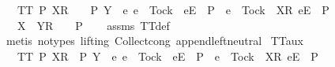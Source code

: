 \ \ \ {\isachardoublequoteopen}TT{}\ P{\isachardoublequoteclose}\ {\isachardoublequoteopen}{\isacharbrackleft}{\isacharbrackleft}X{\isacharbrackright}\isactrlsub R{\isacharbrackright}\ {\isacharat}\ {\isasymsigma}\ {\isasymin}\ P{\isachardoublequoteclose}\ {\isachardoublequoteopen}Y\ {\isasyminter}\ {\isacharbraceleft}e{\isachardot}\ {\isacharparenleft}e\ {\isasymnoteq}\ Tock\ {\isasymand}\ {\isacharbrackleft}{\isacharbrackleft}e{\isacharbrackright}\isactrlsub E{\isacharbrackright}\ {\isasymin}\ P{\isacharparenright}\ {\isasymor}\ {\isacharparenleft}e\ {\isacharequal}\ Tock\ {\isasymand}\ {\isacharbrackleft}{\isacharbrackleft}X{\isacharbrackright}\isactrlsub R{\isacharcomma}\ {\isacharbrackleft}e{\isacharbrackright}\isactrlsub E{\isacharbrackright}\ {\isasymin}\ P{\isacharparenright}\ {\isacharbraceright}\ {\isacharequal}\ {\isacharbraceleft}{\isacharbraceright}{\isachardoublequoteclose}\isanewline
\ \ \ {\isachardoublequoteopen}{\isacharbrackleft}{\isacharbrackleft}X\ {\isasymunion}\ Y{\isacharbrackright}\isactrlsub R{\isacharbrackright}\ {\isacharat}\ {\isasymsigma}\ {\isasymin}\ P{\isachardoublequoteclose}\isanewline
%
\isadelimproof
\ \ %
\endisadelimproof
%
\isatagproof
{}\isamarkupfalse%
\ assms\ TT{}{\isacharunderscore}def\ \isamarkupfalse%
\ {\isacharparenleft}metis\ {\isacharparenleft}no{\isacharunderscore}types{\isacharcomma}\ lifting{\isacharparenright}\ Collect{\isacharunderscore}cong\ append{\isachardot}left{\isacharunderscore}neutral{\isacharparenright}%
\endisatagproof
{\isafoldproof}%
%
\isadelimproof
\isanewline
%
\endisadelimproof
\isanewline
{}\isamarkupfalse%
\ TT{}{\isacharunderscore}aux{}{\isacharcolon}\isanewline
\ \ \ {\isachardoublequoteopen}TT{}\ P{\isachardoublequoteclose}\ {\isachardoublequoteopen}{\isacharbrackleft}{\isacharbrackleft}X{\isacharbrackright}\isactrlsub R{\isacharbrackright}\ {\isasymin}\ P{\isachardoublequoteclose}\ {\isachardoublequoteopen}Y\ {\isasyminter}\ {\isacharbraceleft}e{\isachardot}\ {\isacharparenleft}e\ {\isasymnoteq}\ Tock\ {\isasymand}\ {\isacharbrackleft}{\isacharbrackleft}e{\isacharbrackright}\isactrlsub E{\isacharbrackright}\ {\isasymin}\ P{\isacharparenright}\ {\isasymor}\ {\isacharparenleft}e\ {\isacharequal}\ Tock\ {\isasymand}\ {\isacharbrackleft}{\isacharbrackleft}X{\isacharbrackright}\isactrlsub R{\isacharcomma}\ {\isacharbrackleft}e{\isacharbrackright}\isactrlsub E{\isacharbrackright}\ {\isasymin}\ P{\isacharparenright}\ {\isacharbraceright}\ {\isacharequal}\ {\isacharbraceleft}{\isacharbraceright}{\isachardoublequoteclose}\isanewline
